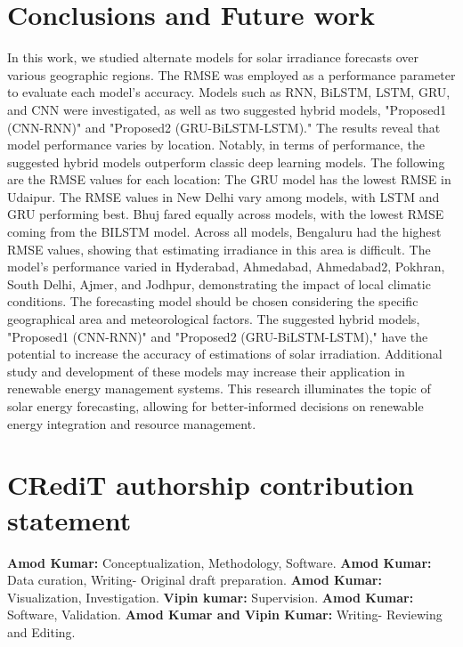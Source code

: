 \documentclass[a4paper,fleqn]{cas-sc}
\begin{document}
\section{Conclusions and Future work}
In this work, we studied alternate models for solar irradiance forecasts over various geographic regions. The RMSE was employed as a performance parameter to evaluate each model's accuracy. Models such as RNN, BiLSTM, LSTM, GRU, and CNN were investigated, as well as two suggested hybrid models, "Proposed1 (CNN-RNN)" and "Proposed2 (GRU-BiLSTM-LSTM)." The results reveal that model performance varies by location. Notably, in terms of performance, the suggested hybrid models outperform classic deep learning models. The following are the RMSE values for each location:
The GRU model has the lowest RMSE in Udaipur. The RMSE values in New Delhi vary among models, with LSTM and GRU performing best. Bhuj fared equally across models, with the lowest RMSE coming from the BILSTM model. Across all models, Bengaluru had the highest RMSE values, showing that estimating irradiance in this area is difficult. The model's performance varied in Hyderabad, Ahmedabad, Ahmedabad2, Pokhran, South Delhi, Ajmer, and Jodhpur, demonstrating the impact of local climatic conditions.
The forecasting model should be chosen considering the specific geographical area and meteorological factors. The suggested hybrid models, "Proposed1 (CNN-RNN)" and "Proposed2 (GRU-BiLSTM-LSTM)," have the potential to increase the accuracy of estimations of solar irradiation. Additional study and development of these models may increase their application in renewable energy management systems. This research illuminates the topic of solar energy forecasting, allowing for better-informed decisions on renewable energy integration and resource management.









\section*{CRediT authorship contribution statement}
\textbf{Amod Kumar:} Conceptualization, Methodology, Software. \textbf{Amod Kumar:} Data curation, Writing- Original draft preparation. \textbf{Amod Kumar:} Visualization, Investigation. \textbf{Vipin kumar:} Supervision. \textbf{Amod Kumar:} Software, Validation. \textbf{Amod Kumar and Vipin Kumar:} Writing- Reviewing and Editing.
\end{document}
